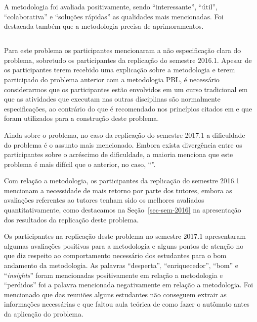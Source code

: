 A metodologia foi avaliada positivamente, sendo
``interessante'', ``útil'', ``colaborativa'' e ``soluções rápidas''
as qualidades mais mencionadas.
Foi destacada também que a metodologia precisa de
aprimoramentos.

\subsection{\ProblemaB}

Para este problema os participantes mencionaram a não especificação clara
do problema, sobretudo os participantes da replicação do semestre 2016.1.
Apesar de os participantes terem recebido
uma explicação sobre a metodologia e terem participado
do problema anterior com a metodologia \ac{PBL}, é necessário considerarmos
que os participantes estão envolvidos em um curso tradicional
em que as atividades que executam nas outras disciplinas são normalmente
especificações, ao contrário do que é recomendado nos princípios citados
em \cite{dolmans1997seven} e que foram utilizados para
a construção deste problema.

Ainda sobre o problema, no caso da replicação do semestre 2017.1 a dificuldade
do problema é o assunto mais mencionado.
Embora exista divergência entre os participantes
sobre o acréscimo de dificuldade, a maioria menciona que este
problema é mais difícil que o anterior, no caso, ``\ProblemaG''.

Com relação a metodologia, os participantes da replicação do semestre 2016.1
mencionam a necessidade de mais retorno por parte dos tutores,
embora as avaliações referentes ao tutores tenham sido
os melhores avaliados quantitativamente, como destacamos
na Seção~\ref{sec-sem-2016} na apresentação dos resultados
da replicação deste problema.

Os participantes na replicação deste problema no semestre 2017.1
apresentaram algumas avaliações positivas para a metodologia
e alguns pontos de atenção no que diz respeito ao
comportamento necessário dos estudantes para o bom
andamento da metodologia.
As palavras ``desperta'', ``enriquecedor'', ``bom'' e ``\textit{insights}''
foram mencionadas positivamente em relação a metodologia e ``perdidos''
foi a palavra mencionada negativamente em relação a metodologia.
Foi mencionado que das reuniões alguns estudantes não conseguem
extrair as informações necessárias e que faltou aula teórica
de como fazer o autômato antes da aplicação do problema.

